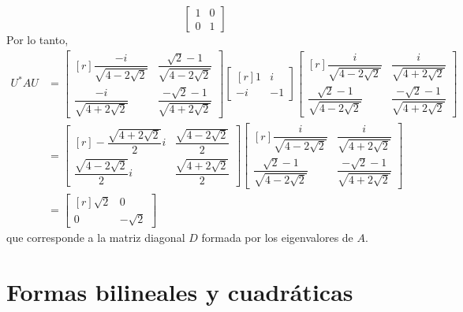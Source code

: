 \begin{example}
$$\begin{bmatrix}
        1 & 0 \\
        0 & 1
    \end{bmatrix}$$\newpage\noindent
    Por lo tanto,
    \begin{align*}
        U^*AU & = \begin{bmatrix*}[r]
            \dfrac{-i}{\sqrt{4 - 2\sqrt{2}}} &  \dfrac{\sqrt{2} - 1}{\sqrt{4 - 2\sqrt{2}}} \\[3.5mm]
            \dfrac{-i}{\sqrt{4 + 2\sqrt{2}}} & \dfrac{- \sqrt{2} - 1}{\sqrt{4 + 2\sqrt{2}}}
        \end{bmatrix*} \begin{bmatrix*}[r]
            1 & i \\
            -i & -1
        \end{bmatrix*} \begin{bmatrix*}[r]
            \dfrac{i}{\sqrt{4 - 2\sqrt{2}}} & \dfrac{i}{\sqrt{4 + 2\sqrt{2}}} \\[3.5mm]
            \dfrac{\sqrt{2} - 1}{\sqrt{4 - 2\sqrt{2}}} & \dfrac{- \sqrt{2} - 1}{\sqrt{4 + 2\sqrt{2}}}
        \end{bmatrix*} \\
        & = \begin{bmatrix*}[r]
            -\dfrac{\sqrt{4 + 2\sqrt{2}}}{2}i & \dfrac{\sqrt{4 - 2\sqrt{2}}}{2} \\[3.5mm]
            \dfrac{\sqrt{4 - 2\sqrt{2}}}{2}i & \dfrac{\sqrt{4 + 2\sqrt{2}}}{2}
        \end{bmatrix*} \begin{bmatrix*}[r]
            \dfrac{i}{\sqrt{4 - 2\sqrt{2}}} & \dfrac{i}{\sqrt{4 + 2\sqrt{2}}} \\[3.5mm]
            \dfrac{\sqrt{2} - 1}{\sqrt{4 - 2\sqrt{2}}} & \dfrac{- \sqrt{2} - 1}{\sqrt{4 + 2\sqrt{2}}}
        \end{bmatrix*} \\
        & = \begin{bmatrix*}[r]
            \sqrt{2} & 0 \\
            0 & - \sqrt{2}
        \end{bmatrix*}
    \end{align*}
    que corresponde a la matriz diagonal $D$ formada por los eigenvalores de $A$.
\end{example}

\section{Formas bilineales y cuadráticas}

